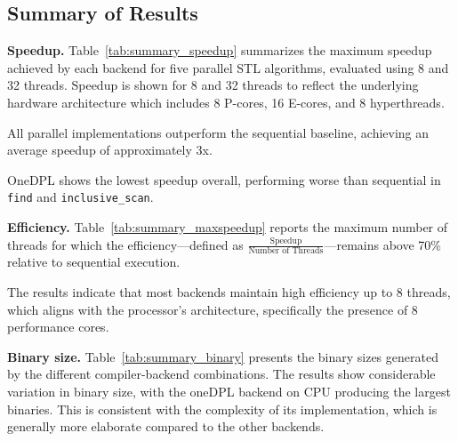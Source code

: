 \documentclass[sigconf]{acmart}
\newcommand{\mypar}[1]{{\bf #1.}}
\begin{document}
\subsection{Summary of Results}

\mypar{Speedup}
Table~\ref{tab:summary_speedup} summarizes the maximum speedup achieved by each backend
for five parallel STL algorithms, evaluated using 8 and 32 threads.
Speedup is shown for 8 and 32 threads to reflect the underlying hardware
architecture which includes 8 P-cores, 16 E-cores, and 8 hyperthreads.

All parallel implementations outperform the sequential baseline, achieving an
average speedup of approximately 3x.

OneDPL shows the lowest speedup overall, performing worse than sequential in
\texttt{find} and \texttt{inclusive\_scan}.

\mypar{Efficiency}
Table~\ref{tab:summary_maxspeedup} reports the maximum number of threads for
which the efficiency—defined as
$\frac{\text{Speedup}}{\text{Number of Threads}}$—remains above 70\%
relative to sequential execution.

The results indicate that most backends maintain high efficiency up to 8
threads, which aligns with the processor's architecture, specifically the
presence of 8 performance cores.

\mypar{Binary size}
Table~\ref{tab:summary_binary} presents the binary sizes generated by the
different compiler-backend combinations. The results show considerable variation
in binary size, with the oneDPL backend on CPU producing the largest binaries.
This is consistent with the complexity of its implementation, which is generally
more elaborate compared to the other backends.
\end{document}

